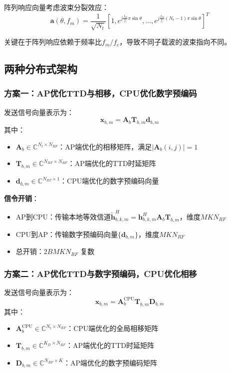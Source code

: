 \documentclass[10pt,twocolumn]{IEEEtran}
\newcommand{\Complex}{\mathbb{C}}
\newcommand{\vect}[1]{\mathbf{#1}}
\newcommand{\mat}[1]{\mathbf{#1}}
\begin{document}
阵列响应向量考虑波束分裂效应：
\begin{equation}
\vect{a}(\theta, f_m) = \frac{1}{\sqrt{N_t}}\left[1, e^{j\frac{f_m}{f_c}\pi\sin\theta}, \ldots, e^{j\frac{f_m}{f_c}(N_t-1)\pi\sin\theta}\right]^T
\end{equation}

关键在于阵列响应依赖于频率比$f_m/f_c$，导致不同子载波的波束指向不同。

\subsection{两种分布式架构}

\subsubsection{方案一：AP优化TTD与相移，CPU优化数字预编码}

发送信号向量表示为：
\begin{equation}
\vect{x}_{b,m} = \mat{A}_b \mat{T}_{b,m} \vect{d}_{b,m}
\end{equation}
其中：
\begin{itemize}
\item $\mat{A}_b \in \Complex^{N_t \times N_{RF}}$：AP端优化的相移矩阵，满足$|\mat{A}_b(i,j)| = 1$
\item $\mat{T}_{b,m} \in \Complex^{N_{RF} \times N_{RF}}$：AP端优化的TTD时延矩阵
\item $\vect{d}_{b,m} \in \Complex^{N_{RF} \times 1}$：CPU端优化的数字预编码向量
\end{itemize}

\textbf{信令开销}：
\begin{itemize}
\item AP到CPU：传输本地等效信道$\tilde{\vect{h}}_{b,k,m}^H = \vect{h}_{b,k,m}^H \mat{A}_b \mat{T}_{b,m}$，维度$MK N_{RF}$
\item CPU到AP：传输数字预编码向量$\{\vect{d}_{b,m}\}$，维度$MK N_{RF}$
\item 总开销：$2BMK N_{RF}$ 复数
\end{itemize}

\subsubsection{方案二：AP优化TTD与数字预编码，CPU优化相移}

发送信号向量表示为：
\begin{equation}
\vect{x}_{b,m} = \mat{A}_b^{\text{CPU}} \mat{T}_{b,m} \mat{D}_{b,m}
\end{equation}
其中：
\begin{itemize}
\item $\mat{A}_b^{\text{CPU}} \in \Complex^{N_t \times N_{RF}}$：CPU端优化的全局相移矩阵
\item $\mat{T}_{b,m} \in \Complex^{K_D \times N_{RF}}$：AP端优化的TTD时延矩阵
\item $\mat{D}_{b,m} \in \Complex^{N_{RF} \times K}$：AP端优化的数字预编码矩阵
\end{itemize}
\end{document}
